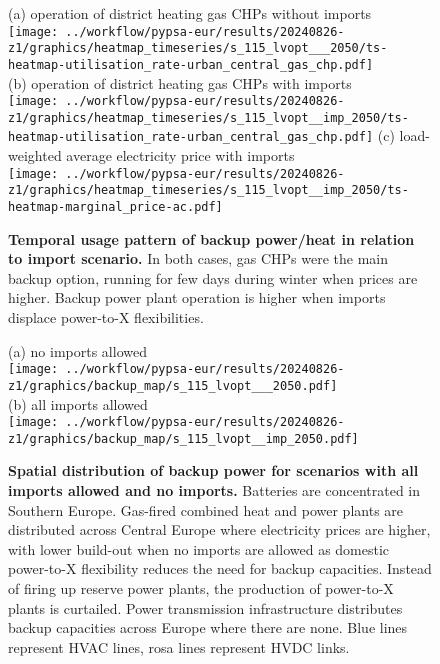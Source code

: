 \begin{figure*}
    \centering
    \footnotesize
    (a) operation of district heating gas CHPs without imports  \\
    \texttt{[image: ../workflow/pypsa-eur/results/20240826-z1/graphics/heatmap\_timeseries/s\_115\_lvopt\_\_\_2050/ts-heatmap-utilisation\_rate-urban\_central\_gas\_chp.pdf]} \\
    (b) operation of district heating gas CHPs with imports \\
    \texttt{[image: ../workflow/pypsa-eur/results/20240826-z1/graphics/heatmap\_timeseries/s\_115\_lvopt\_\_imp\_2050/ts-heatmap-utilisation\_rate-urban\_central\_gas\_chp.pdf]}
    (c) load-weighted average electricity price with imports \\
    \texttt{[image: ../workflow/pypsa-eur/results/20240826-z1/graphics/heatmap\_timeseries/s\_115\_lvopt\_\_imp\_2050/ts-heatmap-marginal\_price-ac.pdf]}
    \caption{\textbf{Temporal usage pattern of backup power/heat in relation to
    import scenario.} In both cases, gas CHPs were the main backup option,
    running for few days during winter when prices are higher. Backup power
    plant operation is higher when imports displace power-to-X flexibilities.}
    \label{fig:si:backup-power}
\end{figure*}

\begin{figure*}
    \centering
    \footnotesize
    (a) no imports allowed  \\
    \texttt{[image: ../workflow/pypsa-eur/results/20240826-z1/graphics/backup\_map/s\_115\_lvopt\_\_\_2050.pdf]} \\
    (b) all imports allowed \\
    \texttt{[image: ../workflow/pypsa-eur/results/20240826-z1/graphics/backup\_map/s\_115\_lvopt\_\_imp\_2050.pdf]}
    \caption{\textbf{Spatial distribution of backup power for scenarios with all
    imports allowed and no imports.} Batteries are concentrated in Southern
    Europe. Gas-fired combined heat and power plants are distributed across
    Central Europe where electricity prices are higher, with lower build-out
    when no imports are allowed as domestic power-to-X flexibility reduces the
    need for backup capacities. Instead of firing up reserve power plants, the
    production of power-to-X plants is curtailed. Power transmission
    infrastructure distributes backup capacities across Europe where there are none.
    Blue lines represent HVAC lines, rosa lines represent HVDC links.}
    \label{fig:si:backup-power-map}
\end{figure*}


